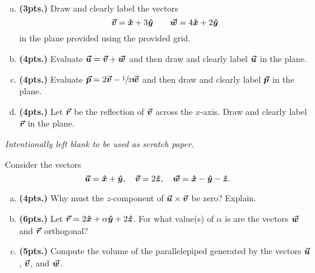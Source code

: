 \documentclass[12pt]{amsbook}
\begin{document}
\newpage
\begin{problem}~
\begin{enumerate}[(a)]
    \item \textbf{(3pts.)} Draw and clearly label the vectors
\[
\vecv=\xhat + 3\yhat \qquad \vecw=4\xhat + 2\yhat
\]
in the plane provided using the provided grid.

\item \textbf{(4pts.)} Evaluate $\vecu=\vecv+\vecw$ and then draw and clearly label $\vecu$ in the plane.

\item \textbf{(4pts.)} Evaluate $\vecp=2\vecv-\sfrac{1}{2}\vecw$ and then draw and clearly label $\vecp$ in the plane.

\item \textbf{(4pts.)} Let $\vecr$ be the reflection of $\vecv$ across the $x$-axis. Draw and clearly label $\vecr$ in the plane.
\end{enumerate}

    \begin{center}
    \end{center}

\end{problem}


\newpage
\emph{Intentionally left blank to be used as scratch paper.}\\


\newpage
\begin{problem}
Consider the vectors 
\[
\vecu = \xhat + \yhat, \quad \vecv=2\zhat, \quad \vecw = \xhat -\yhat- \zhat.
\]
\begin{enumerate}[(a)]
    \item \textbf{(4pts.)} Why must the $z$-component of $\vecu \times \vecv$ be zero? Explain.
    \vspace*{5cm}
    \item \textbf{(6pts.)} Let $\vecr = 2\xhat +\alpha \yhat + 2\zhat$. For what value(s) of $\alpha$ is are the vectors $\vecw$ and $\vecr$ orthogonal?
    \vspace*{6cm}
    \item \textbf{(5pts.)} Compute the volume of the parallelepiped generated by the vectors $\vecu$, $\vecv$, and $\vecw$.
    \vspace*{6cm}
    
\end{enumerate}
\end{problem}
\end{document}
